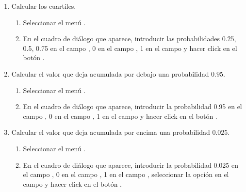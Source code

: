 \begin{enumerate}[leftmargin=*]
\begin{enumerate}
\item Calcular los cuartiles.
\begin{indicacion}
\begin{enumerate}
\item Seleccionar el menú .
\item En el cuadro de diálogo que aparece, introducir las probabilidades 0.25, 0.5, 0.75 en el campo , 0 en el
campo , 1 en el campo  y hacer click en el botón .
\end{enumerate}
\end{indicacion}

\item Calcular el valor que deja acumulada por debajo una probabilidad $0.95$.
\begin{indicacion}
\begin{enumerate}
\item Seleccionar el menú .
\item En el cuadro de diálogo que aparece, introducir la probabilidad 0.95 en el campo , 0 en el
campo , 1 en el campo  y hacer click en el botón .
\end{enumerate}
\end{indicacion}

\item Calcular el valor que deja acumulada por encima una probabilidad $0.025$.
\begin{indicacion}
\begin{enumerate}
\item Seleccionar el menú .
\item En el cuadro de diálogo que aparece, introducir la probabilidad 0.025 en el campo , 0
en el campo , 1 en el campo , seleccionar la opción  en el campo
 y hacer click en el botón .
\end{enumerate}
\end{indicacion}
\end{enumerate}



\end{enumerate}
